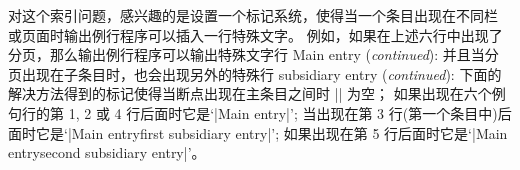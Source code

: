 \ddanger 对这个索引问题，感兴趣的是设置一个标记系统，使得当一个条目出现在不同栏%
或页面时输出例行程序可以插入一行特殊文字。%
例如，如果在上述六行中出现了分页，那么输出例行程序可以输出特殊文字行
\begindisplay
Main entry ({\it continued}\thinspace):
\enddisplay
并且当分页出现在子条目时，也会出现另外的特殊行
\begindisplay
\quad subsidiary entry ({\it continued}\thinspace):
\enddisplay
下面的解决方法得到的标记使得当断点出现在主条目之间时 |\botmark| 为空；
如果出现在六个例句行的第 1, 2 或 4 行后面时它是`|Main entry|';
当出现在第 3 行(第一个条目中)后面时它是`|Main entry\sub first subsidiary entry|';
如果出现在第 5 行后面时它是`|Main entry\sub second subsidiary entry|'。


